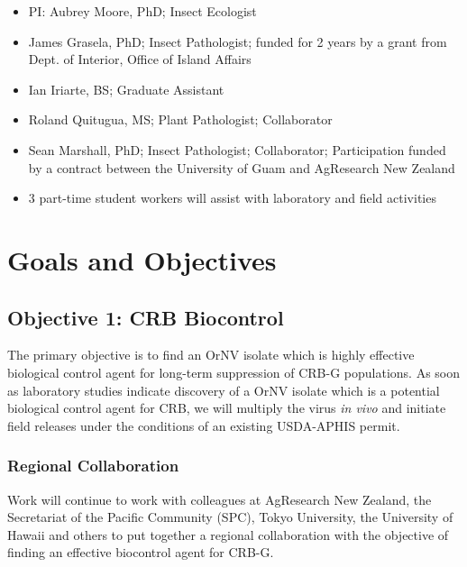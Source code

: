 \documentclass[14pt,english,letterpaper]{scrartcl}
\begin{document}
\begin{itemize}
\item PI: Aubrey Moore, PhD; Insect Ecologist
\item James Grasela, PhD; Insect Pathologist; funded for 2 years by a grant from Dept. of
Interior, Office of Island Affairs
\item Ian Iriarte, BS; Graduate Assistant
\item Roland Quitugua, MS; Plant Pathologist; Collaborator
\item Sean Marshall, PhD; Insect Pathologist; Collaborator; Participation funded by a contract
between the University of Guam and AgResearch New Zealand
\item 3 part-time student workers will assist with laboratory and field activities
\end{itemize}

\pagebreak

\section{Goals and Objectives} \label{goals}


\subsection{Objective 1: CRB Biocontrol}

The primary objective is to find an OrNV isolate which is highly effective biological control agent for long-term suppression of CRB-G populations. As soon as laboratory studies indicate discovery of a OrNV isolate which is a potential biological control agent for CRB, we will multiply the virus \textit{in vivo} and initiate field releases under the conditions of an existing USDA-APHIS permit.

\subsubsection{Regional Collaboration}

Work will continue to work with colleagues at AgResearch New Zealand, the Secretariat of the Pacific Community (SPC), Tokyo University, the University of Hawaii and others to put together a regional collaboration with the objective of finding an effective biocontrol agent for CRB-G. 
\end{document}
